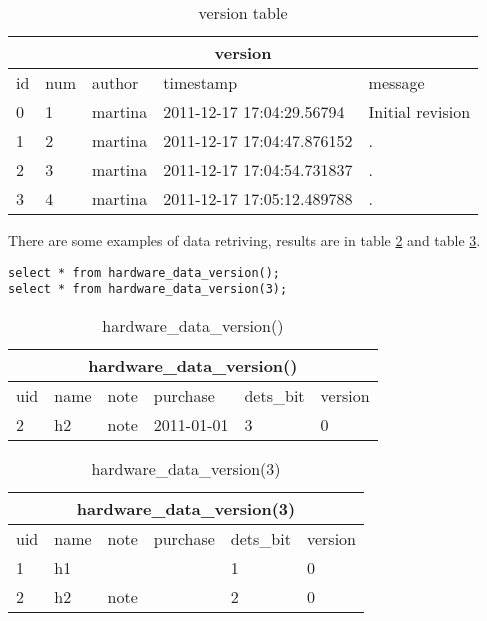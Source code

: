 \documentclass[deska]{subfiles}
\begin{document}
\begin{center}

\begin{table}
    \caption{version table}
    \label{tab-example-version}
\begin{tabular}{ | l | l | l | l | l |}
    \hline
    \multicolumn{5}{|c|}{version}\\
    \hline
    id & num & author & timestamp & message\\
    \hline
    0 & 1 & martina & 2011-12-17 17:04:29.56794 & Initial revision\\
    1 & 2 & martina & 2011-12-17 17:04:47.876152 & .\\
    2 & 3 & martina & 2011-12-17 17:04:54.731837 & .\\
    3 & 4 & martina & 2011-12-17 17:05:12.489788 & .\\
    \hline
\end{tabular}
\end{table}

\end{center}


There are some examples of data retriving, results are in table \ref{tab-select-hardware} and table \ref{tab-select-hardware-v3}.

\begin{verbatim}
select * from hardware_data_version();
select * from hardware_data_version(3);
\end{verbatim}

\begin{center}

\begin{table}
    \caption{hardware\_data\_version()}
    \label{tab-select-hardware}
\begin{tabular}{ | l | l | l | l | l | l |}
    \hline
    \multicolumn{6}{|c|}{hardware\_data\_version()}\\
    \hline
    uid & name & note & purchase & dets\_bit & version\\
    \hline
    2 & h2 & note & 2011-01-01 & 3 & 0\\
    \hline
\end{tabular}
\end{table}

\end{center}

\begin{center}

\begin{table}
    \caption{hardware\_data\_version(3)}
    \label{tab-select-hardware-v3}
\begin{tabular}{ | l | l | l | l | l | l |}
    \hline
    \multicolumn{6}{|c|}{hardware\_data\_version(3)}\\
    \hline
    uid & name & note  & purchase& dets\_bit & version\\
    \hline
    1 & h1 &  &  & 1 & 0\\
    2 & h2 & note &  & 2 & 0\\
    \hline
\end{tabular}
\end{table}

\end{center}
\end{document}
